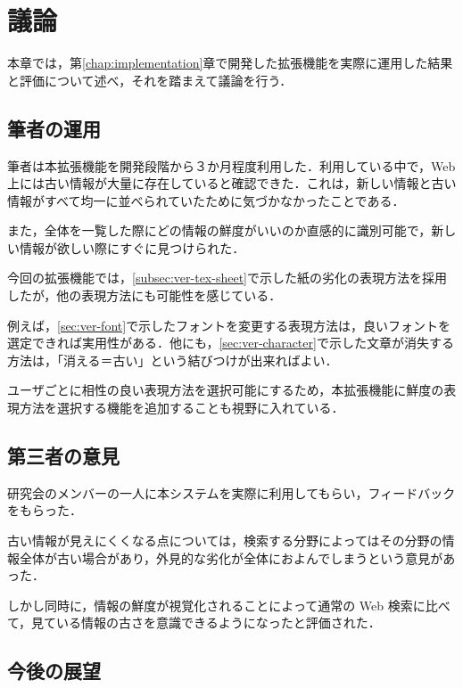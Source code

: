 \chapter{議論}
\label{chap:discussion}

本章では，第\ref{chap:implementation}章で開発した拡張機能を実際に運用した結果と評価について述べ，それを踏まえて議論を行う．

\newpage

\section{筆者の運用}

筆者は本拡張機能を開発段階から３か月程度利用した．利用している中で，Web 上には古い情報が大量に存在していると確認できた．これは，新しい情報と古い情報がすべて均一に並べられていたために気づかなかったことである．

また，全体を一覧した際にどの情報の鮮度がいいのか直感的に識別可能で，新しい情報が欲しい際にすぐに見つけられた．

今回の拡張機能では，\ref{subsec:ver-tex-sheet}で示した紙の劣化の表現方法を採用したが，他の表現方法にも可能性を感じている．

例えば，\ref{sec:ver-font}で示したフォントを変更する表現方法は，良いフォントを選定できれば実用性がある．他にも，\ref{sec:ver-character}で示した文章が消失する方法は，「消える＝古い」という結びつけが出来ればよい．

ユーザごとに相性の良い表現方法を選択可能にするため，本拡張機能に鮮度の表現方法を選択する機能を追加することも視野に入れている．

\section{第三者の意見}
\label{sec:dis_third}

研究会のメンバーの一人に本システムを実際に利用してもらい，フィードバックをもらった．

古い情報が見えにくくなる点については，検索する分野によってはその分野の情報全体が古い場合があり，外見的な劣化が全体におよんでしまうという意見があった．

しかし同時に，情報の鮮度が視覚化されることによって通常の Web 検索に比べて，見ている情報の古さを意識できるようになったと評価された．

\section{今後の展望}

